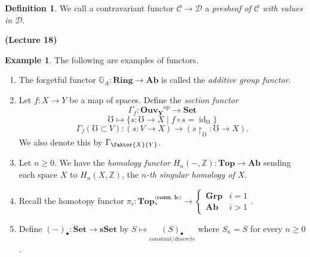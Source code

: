 \documentclass[10pt,letterpaper,cm]{nupset}
\theoremstyle{definition}
\newtheorem*{definition}{Definition}
\newtheorem{exmp}{Example}
\newcommand{\G}{\mathbb G}
\newcommand{\Z}{\mathbb Z}
\newcommand{\1}{\mathbf{1}}
\renewcommand{\c}{\mathscr{C}}
\renewcommand{\d}{\mathscr{D}}
\newcommand{\0}{\vec 0}
\DeclareMathOperator{\id}{id}
\DeclareMathOperator{\op}{op}
\begin{document}
\begin{definition}
We call a contravariant functor $\c \to \d$ a \textit{presheaf of $\c$ with values in $\d$}.
\end{definition}

\begin{center}
{\textbf{(Lecture 18)}}
\end{center}

\begin{exmp}  The following are examples of functors.
\begin{enumerate}
\item The forgetful functor $\G_A: \mathbf{Ring} \to \mathbf{Ab}$ is called the \textit{additive group functor}.
\item Let $f: X \to Y$ be a map of spaces. Define the \textit{section functor}
 $$\Gamma_f: \mathbf{Ouv_Y}^{\op} \to \mathbf{Set}$$
$$\mho \mapsto \{s: \mho \to X \mid f \circ s = \id_{\mho}\}$$
$$\Gamma_f(\mho \subset V) : (s: V \to X) \to (s\restriction_{\mho} : \mho \to X).$$ We also denote this by $\Gamma_{\faktor{X}{Y}}$.
\item Let $n\geq 0$. We have the \textit{homology functor} $H_n(-, \Z) : \mathbf{Top} \to \mathbf{Ab}$ sending each space $X$ to $H_n(X, \Z)$, the \textit{$n$-th singular homology of $X$}.
\item Recall the homotopy functor $\pi_i : \mathbf{Top_{\ast}^{\text{(conn, lc)}}} \to
 \begin{cases} 
\mathbf{Grp} & i = 1 \\
\mathbf{Ab} & i >1
\end{cases}.$
\item Define $(-)_{\bullet} : \mathbf{Set} \to {\mathbf{sSet}}$ by $S \mapsto \underset{\textit{constant/discrete}}{(S)_{\bullet}}$ where $S_n =S$ for every $n\geq 0$.


\end{enumerate}
\end{exmp}
\end{document}
